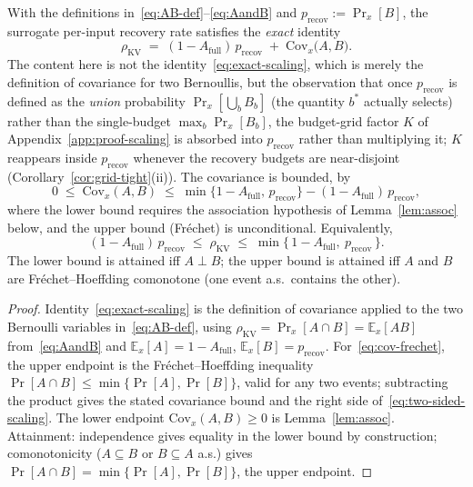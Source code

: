 \begin{theorem}
\label{thm:tight-scaling}
With the definitions in~\eqref{eq:AB-def}--\eqref{eq:AandB} and
$p_{\mathrm{recov}}:=\Pr_x[B]$, the surrogate per-input recovery rate satisfies
the \emph{exact} identity
\begin{equation}
\label{eq:exact-scaling}
\rho_{\mathrm{KV}}
\;=\; (1-A_{\mathrm{full}})\,p_{\mathrm{recov}} \;+\; \mathrm{Cov}_x\!\bigl(A,B\bigr).
\end{equation}
The content here is not the identity~\eqref{eq:exact-scaling}, which is merely
the definition of covariance for two Bernoullis, but the observation that once
$p_{\mathrm{recov}}$ is defined as the \emph{union} probability
$\Pr_x[\bigcup_b B_b]$ (the quantity $b^*$ actually selects) rather than the
single-budget $\max_b\Pr_x[B_b]$, the budget-grid factor $K$ of
Appendix~\ref{app:proof-scaling} is absorbed into $p_{\mathrm{recov}}$ rather
than multiplying it; $K$ reappears inside $p_{\mathrm{recov}}$ whenever the
recovery budgets are near-disjoint (Corollary~\ref{cor:grid-tight}(ii)). The
covariance is bounded, by
\begin{equation}
\label{eq:cov-frechet}
0 \;\le\; \mathrm{Cov}_x(A,B) \;\le\; \min\{1-A_{\mathrm{full}},\,p_{\mathrm{recov}}\} - (1-A_{\mathrm{full}})\,p_{\mathrm{recov}},
\end{equation}
where the lower bound requires the association hypothesis of
Lemma~\ref{lem:assoc} below, and the upper bound (Fr\'echet) is
unconditional. Equivalently,
\begin{equation}
\label{eq:two-sided-scaling}
\boxed{\;
(1-A_{\mathrm{full}})\,p_{\mathrm{recov}}
\;\le\;
\rho_{\mathrm{KV}}
\;\le\;
\min\{\,1-A_{\mathrm{full}},\ p_{\mathrm{recov}}\,\}.
\;}
\end{equation}
The lower bound is attained iff $A\perp B$; the upper bound is attained iff
$A$ and $B$ are Fr\'echet--Hoeffding comonotone (one event a.s.\ contains the
other).
\end{theorem}

\begin{proof}
Identity~\eqref{eq:exact-scaling} is the definition of covariance applied to
the two Bernoulli variables in~\eqref{eq:AB-def}, using
$\rho_{\mathrm{KV}}=\Pr_x[A\cap B]=\mathbb{E}_x[AB]$ from~\eqref{eq:AandB} and
$\mathbb{E}_x[A]=1-A_{\mathrm{full}}$, $\mathbb{E}_x[B]=p_{\mathrm{recov}}$.
For~\eqref{eq:cov-frechet}, the upper endpoint is the Fr\'echet--Hoeffding
inequality $\Pr[A\cap B]\le\min\{\Pr[A],\Pr[B]\}$, valid for any two events;
subtracting the product gives the stated covariance bound and the right side
of~\eqref{eq:two-sided-scaling}. The lower endpoint $\mathrm{Cov}_x(A,B)\ge0$
is Lemma~\ref{lem:assoc}. Attainment: independence gives equality in the lower
bound by construction; comonotonicity ($A\subseteq B$ or $B\subseteq A$ a.s.)
gives $\Pr[A\cap B]=\min\{\Pr[A],\Pr[B]\}$, the upper endpoint.
\end{proof}

